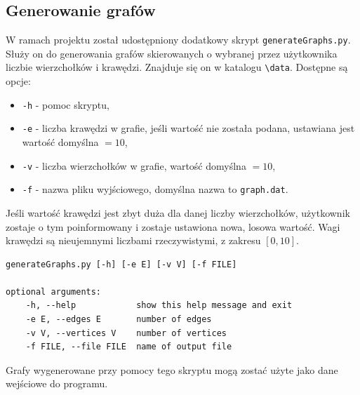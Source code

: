 \documentclass[12pt]{article}
\begin{document}
\subsection{Generowanie grafów} \label{sec:gen_g}
W ramach projektu został udostępniony dodatkowy skrypt  \lstinline|generateGraphs.py|. Służy on do generowania grafów skierowanych o wybranej przez użytkownika liczbie wierzchołków i krawędzi. Znajduje się on w katalogu \lstinline|\data|. Dostępne są opcje:
\begin{itemize}
\item \lstinline|-h| - pomoc skryptu,
\item \lstinline|-e| - liczba krawędzi w grafie, jeśli wartość nie została podana, ustawiana jest wartość domyślna $=10$,
\item \lstinline|-v| - liczba wierzchołków w grafie, wartość domyślna $=10$,
\item \lstinline|-f| - nazwa pliku wyjściowego, domyślna nazwa to \lstinline{graph.dat}.
\end{itemize}

Jeśli wartość krawędzi jest zbyt duża dla danej liczby wierzchołków, użytkownik zostaje o tym poinformowany i zostaje ustawiona nowa, losowa wartość. Wagi krawędzi są nieujemnymi liczbami rzeczywistymi, z zakresu $[0, 10]$.

\begin{lstlisting}[caption={Pomoc skryptu \lstinline|generateGraphs.py|.}, captionpos=b ]
generateGraphs.py [-h] [-e E] [-v V] [-f FILE]

optional arguments:
	-h, --help            show this help message and exit
	-e E, --edges E       number of edges
	-v V, --vertices V    number of vertices
	-f FILE, --file FILE  name of output file
\end{lstlisting}

Grafy wygenerowane przy pomocy tego skryptu mogą zostać użyte jako dane wejściowe do programu.
\end{document}
